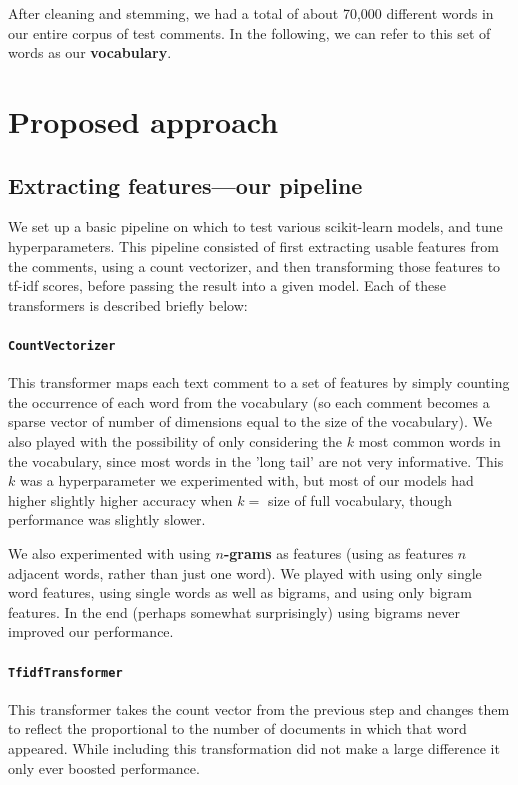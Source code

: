 \documentclass[letterpaper, 11pt]{article}
\begin{document}
After cleaning and stemming, we had a total of about 70,000 different words in our entire corpus of test comments.  In the following, we can refer to this set of words as our \textbf{vocabulary}.


\section{Proposed approach}
 

\subsection{Extracting features---our pipeline}
We set up a basic pipeline on which to test various scikit-learn models, and tune hyperparameters.  This pipeline consisted of first extracting usable features from the comments, using a count vectorizer, and then transforming those features to tf-idf scores, before passing the result into a given model.  Each of these transformers is described briefly below:

\paragraph{\texttt{CountVectorizer}} This transformer maps each text comment to a set of features by simply counting the occurrence of each word from the vocabulary (so each comment becomes a sparse vector of number of dimensions equal to the size of the vocabulary). We also played with the possibility of only considering the $k$ most common words in the vocabulary, since most words in the 'long tail' are not very informative. This $k$ was a hyperparameter we experimented with, but most of our models had higher slightly higher accuracy when $k=$ size of full vocabulary, though performance was slightly slower.

We also experimented with using \textbf{$n$-grams} as features (using as features  $n$ adjacent words, rather than just one word).  We played with using only single word features, using single words as well as bigrams, and using only bigram features.  In the end (perhaps somewhat surprisingly) using bigrams never improved our performance.

\paragraph{\texttt{TfidfTransformer}} This transformer takes the count vector from the previous step and changes them to reflect the proportional to the number of documents in which that word appeared.  While including this transformation did not make a large difference it only ever boosted performance.
\end{document}
